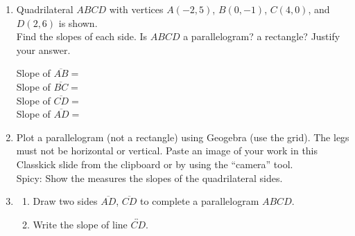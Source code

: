 \begin{enumerate}
\item Quadrilateral $ABCD$ with vertices $A(-2,5)$, $B(0,-1)$, $C(4,0)$, and $D(2,6)$ is shown. \\[0.5cm]
Find the slopes of each side. Is $ABCD$ a parallelogram? a rectangle? Justify your answer.
\begin{multicols}{2}
  Slope of $\overline{AB}=$\\[1.5cm]
  Slope of $\overline{BC}=$\\[1.5cm]
  Slope of $\overline{CD}=$\\[1.5cm]
  Slope of $\overline{AD}=$\\
  \begin{flushright}
    \end{flushright}
  \end{multicols}

\item Plot a parallelogram (not a rectangle) using Geogebra (use the grid). The legs must not be horizontal or vertical. Paste an image of your work in this Classkick slide from the clipboard or by using the ``camera'' tool.\\[0.25cm]
Spicy: Show the measures the slopes of the quadrilateral sides.

\item 
  \begin{enumerate}
    \item Draw two sides $\overline{AD}$, $\overline{CD}$ to complete a parallelogram $ABCD$. \vspace{0.25cm}
    \item Write the slope of line $\overleftrightarrow{CD}$.
    \begin{multicols}{2}
      

\end{multicols}
\end{enumerate}
\end{enumerate}
